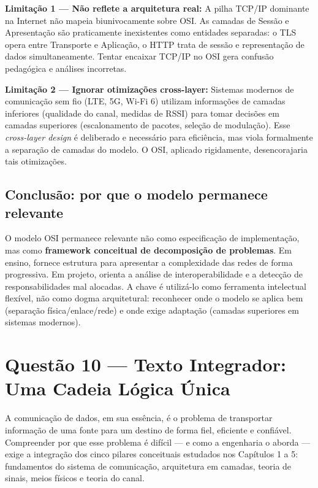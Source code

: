 \documentclass[conference]{IEEEtran}
\begin{document}
\textbf{Limitação 1 --- Não reflete a arquitetura real:} A pilha TCP/IP dominante na
Internet não mapeia biunivocamente sobre OSI. As camadas de Sessão e Apresentação são
praticamente inexistentes como entidades separadas: o TLS opera entre Transporte e
Aplicação, o HTTP trata de sessão e representação de dados simultaneamente. Tentar
encaixar TCP/IP no OSI gera confusão pedagógica e análises incorretas.

\textbf{Limitação 2 --- Ignorar otimizações cross-layer:} Sistemas modernos de comunicação
sem fio (LTE, 5G, Wi-Fi 6) utilizam informações de camadas inferiores (qualidade do canal,
medidas de RSSI) para tomar decisões em camadas superiores (escalonamento de pacotes,
seleção de modulação). Esse \textit{cross-layer design} é deliberado e necessário para
eficiência, mas viola formalmente a separação de camadas do modelo. O OSI, aplicado
rigidamente, desencorajaria tais otimizações.

\subsection*{Conclusão: por que o modelo permanece relevante}

O modelo OSI permanece relevante não como especificação de implementação, mas como
\textbf{framework conceitual de decomposição de problemas}. Em ensino, fornece
estrutura para apresentar a complexidade das redes de forma progressiva. Em projeto,
orienta a análise de interoperabilidade e a detecção de responsabilidades mal alocadas.
A chave é utilizá-lo como ferramenta intelectual flexível, não como dogma arquitetural:
reconhecer onde o modelo se aplica bem (separação física/enlace/rede) e onde exige
adaptação (camadas superiores em sistemas modernos).

\section*{Questão 10 — Texto Integrador: Uma Cadeia Lógica Única}

A comunicação de dados, em sua essência, é o problema de transportar informação de uma fonte
para um destino de forma fiel, eficiente e confiável. Compreender por que esse problema é
difícil --- e como a engenharia o aborda --- exige a integração dos cinco pilares conceituais
estudados nos Capítulos 1 a 5: fundamentos do sistema de comunicação, arquitetura em camadas,
teoria de sinais, meios físicos e teoria do canal.
\end{document}
